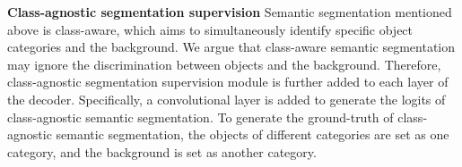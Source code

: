 \documentclass[10pt,twocolumn,letterpaper]{article}
\begin{document}
\begin{table*}
\renewcommand{\arraystretch}{1.2}
\footnotesize
\centering
\begin{center}
\end{center}
\caption{Ablation experiments of PairNet and TripleNet on the \texttt{VOC2012-val-seg} set. The backbone model is ResNet50 \cite{He_ResNet_CVPR_2016}, and the input image is rescaled to the size of . ``MFS'' means multiscale fused segmentation, ``IC'' means inner-connected module, ``CAS'' means class-aware segmentation, and ``ASF'' means attention skip-layer fusion.}
\label{tab01}
\end{table*}
\textbf{Class-agnostic segmentation supervision} Semantic segmentation mentioned above is class-aware, which aims to simultaneously identify specific object categories and the background. We argue that class-aware semantic segmentation may ignore the discrimination between objects and the background. Therefore, class-agnostic segmentation supervision module is further added to each layer of the decoder. Specifically, a  convolutional layer is added to generate the logits of class-agnostic semantic segmentation. To generate the ground-truth of class-agnostic semantic segmentation, the objects of different categories are set as one category, and the background is set as another category.
\end{document}
